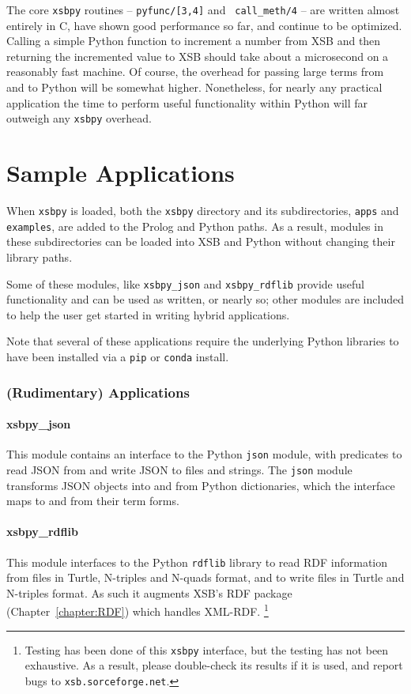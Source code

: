The core {\tt xsbpy} routines -- {\tt pyfunc/[3,4]} and {\tt
  call\_meth/4} -- are written almost entirely in C, have shown good
performance so far, and continue to be optimized.  Calling a simple
Python function to increment a number from XSB and then returning the
incremented value to XSB should take about a microsecond on a
reasonably fast machine.  Of course, the overhead for passing large
terms from and to Python will be somewhat higher.  Nonetheless, for
nearly any practical application the time to perform useful
functionality within Python will far outweigh any {\tt xsbpy}
overhead.

\section{Sample Applications}
When {\tt xsbpy} is loaded, both the {\tt xsbpy} directory and its
subdirectories, {\tt apps} and {\tt examples}, are added to the Prolog
and Python paths.  As a result, modules in these subdirectories can be
loaded into XSB and Python without changing their library paths.

Some of these modules, like {\tt xsbpy\_json} and {\tt xsbpy\_rdflib}
provide useful functionality and can be used as written, or nearly so;
other modules are included to help the user get started in writing
hybrid applications.

Note that several of these applications require the underlying Python
libraries to have been installed via a {\tt pip} or {\tt conda}
install.

\subsubsection{(Rudimentary) Applications}

\paragraph{xsbpy\_json}
This module contains an interface to the Python {\tt json} module,
with predicates to read JSON from and write JSON to files and strings.
The {\tt json} module transforms JSON objects into and from Python
dictionaries, which the interface maps to and from their term forms.

\paragraph{xsbpy\_rdflib}
This module interfaces to the Python {\tt rdflib} library to read RDF
information from files in Turtle, N-triples and N-quads format, and to
write files in Turtle and N-triples format.  As such it augments XSB's
RDF package (Chapter~\ref{chapter:RDF}) which handles
XML-RDF. \footnote{Testing has been done of this {\tt xsbpy}
  interface, but the testing has not been exhaustive.  As a result,
  please double-check its results if it is used, and report bugs to
  {\tt xsb.sorceforge.net}.}

